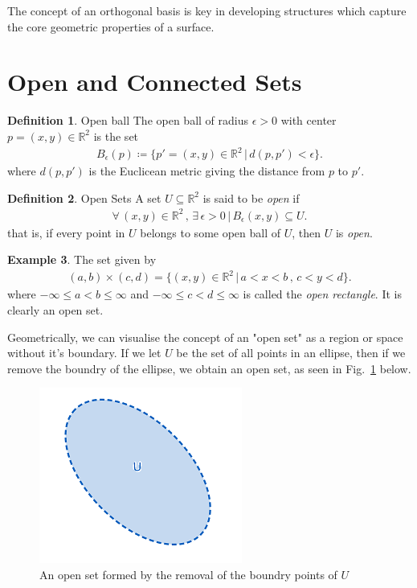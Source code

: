 \documentclass{UKZNcomp}
\theoremstyle{definition}
\newtheorem{definition}{Definition}[section]
\newtheorem{example}[definition]{Example}
\theoremstyle{remark}
\begin{document}
The concept of an orthogonal basis is key in developing structures which capture the core geometric properties of a surface. 

\section{Open and Connected Sets}
\label{sec:openconnectedsets}
\theoremstyle{definition}
\begin{definition}{Open ball }
The open ball of radius $\epsilon>0$ with center $p = (x,y) \in \mathbb{R}^{2}$ is the set
\begin{align*}
B_{\epsilon}(p) \coloneqq \{p' = (x,y) \in \mathbb{R}^{2}\,|\,	 d(p,p') < \epsilon\}.
\end{align*}
where $d(p,p')$ is the Euclicean metric giving the distance from $p$ to $p'$.
\end{definition}

\theoremstyle{definition}
\begin{definition}{Open Sets }
A set $U \subseteq \mathbb{R}^{2}$ is said to be \textit{open} if 
\begin{align*}
\forall \, (x,y) \in \mathbb{R}^{2} \, , \, \exists \, \epsilon > 0 \,|\, B_{\epsilon}(x,y) \subseteq U.
\end{align*}
that is, if every point in $U$ belongs to some open ball of $U$, then $U$ is \textit{open}.
\end{definition}

\begin{example}{}
The set given by
\begin{align*}
(a , b) \times (c , d) = \{ (x , y) \in \mathbb{R}^{2} \,|\, a < x < b\,,\, c < y < d \}.
\end{align*}
where $ - \infty \leq a < b \leq \infty $  \! and \!  $-\infty \leq c < d \leq \infty$ \! is called the \textit{open rectangle}. It is clearly an open set.
\end{example}
Geometrically, we can visualise the concept of an "open set" as a region or space without it's boundary. If we let $U$ be the set of all points in an ellipse, then if we remove the boundry of the ellipse, we obtain an open set, as seen in Fig.~\ref{fig:Openset} below.
\begin{figure}[H]
    \centerline{\includegraphics[scale=1.1]{Openset}}
    \caption[Visualising an open set]{\label{fig:Openset}
    An open set formed by the removal of the boundry points of $U$}
\end{figure}
\end{document}
